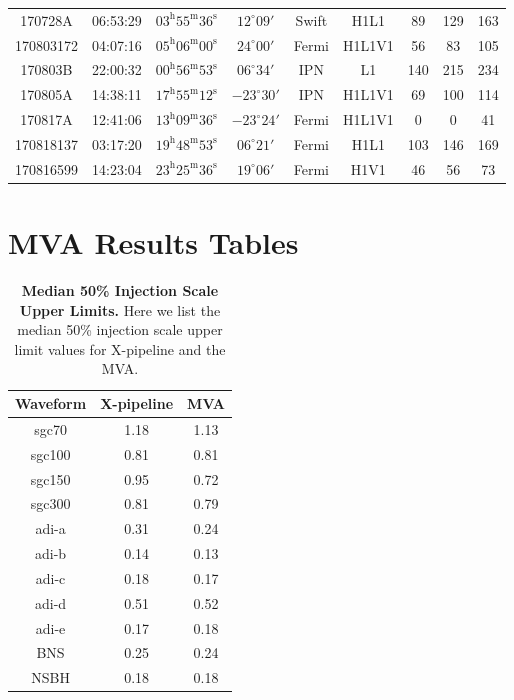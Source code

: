 \documentclass[11pt]{cuthesis}
\newcommand{\xp}{X-pipeline }
\begin{document}
\begin{landscape}
\begin{tabular}{ccccccccc}
170728A   & 06:53:29  & $03^{\mathrm{h}}55^{\mathrm{m}}36^{\mathrm{s}}$ & $12^{\circ}09'$ &  Swift   & H1L1   & 89  & 129 & 163 \\
170803172 & 04:07:16  & $05^{\mathrm{h}}06^{\mathrm{m}}00^{\mathrm{s}}$ & $24^{\circ}00'$ &  Fermi   & H1L1V1 & 56  & 83  & 105 \\
170803B   & 22:00:32  & $00^{\mathrm{h}}56^{\mathrm{m}}53^{\mathrm{s}}$ & $06^{\circ}34'$ &  IPN   & L1       & 140 & 215 & 234 \\
170805A   & 14:38:11  & $17^{\mathrm{h}}55^{\mathrm{m}}12^{\mathrm{s}}$ & $-23^{\circ}30'$ & IPN   & H1L1V1   & 69  & 100 & 114 \\
170817A   & 12:41:06  & $13^{\mathrm{h}}09^{\mathrm{m}}36^{\mathrm{s}}$ & $-23^{\circ}24'$ & Fermi   & H1L1V1 & 0   & 0   & 41 \\
170818137 & 03:17:20  & $19^{\mathrm{h}}48^{\mathrm{m}}53^{\mathrm{s}}$ & $06^{\circ}21'$ &  Fermi   & H1L1   & 103 & 146 & 169 \\
170816599 & 14:23:04  & $23^{\mathrm{h}}25^{\mathrm{m}}36^{\mathrm{s}}$ & $19^{\circ}06'$ &  Fermi   & H1V1   & 46  & 56  & 73 \\ 
\end{tabular}
\end{landscape}


\newpage
\FloatBarrier
\section{MVA Results Tables} \label{appendix:mva tables}

\begin{table}[h]
\centering
\begin{tabular}{  c | c | c }
Waveform   & X-pipeline & MVA \\ \hline                                                       
sgc70   & 1.18 & 1.13 \\
sgc100 & 0.81 & 0.81 \\
sgc150 & 0.95 & 0.72 \\
sgc300 & 0.81 & 0.79 \\
adi-a     & 0.31 & 0.24 \\
adi-b     & 0.14 & 0.13 \\
adi-c     & 0.18 & 0.17 \\
adi-d     & 0.51 & 0.52 \\
adi-e     & 0.17 & 0.18 \\
BNS     & 0.25 & 0.24 \\
NSBH   & 0.18 & 0.18 
\end{tabular}
\caption{\textbf{Median 50\% Injection Scale Upper Limits.} Here we list the median 50\% injection scale upper limit values for \xp and the MVA. }
\end{table}
\end{document}
